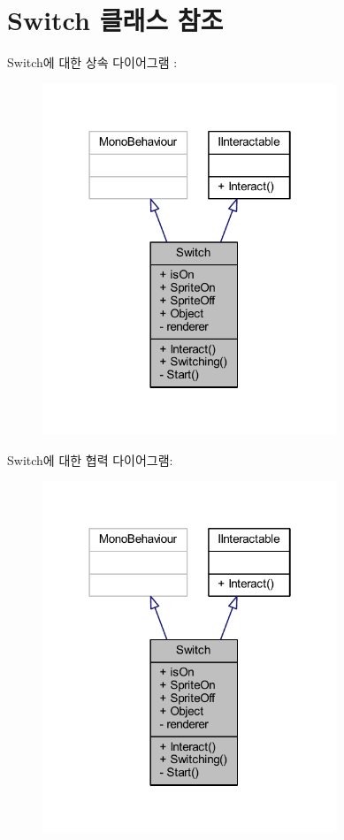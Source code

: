 \hypertarget{class_switch}{}\section{Switch 클래스 참조}
\label{class_switch}


Switch에 대한 상속 다이어그램 \+: \nopagebreak
\begin{figure}[H]
\begin{center}
\leavevmode
\includegraphics[width=250pt]{d5/d5e/class_switch__inherit__graph}
\end{center}
\end{figure}


Switch에 대한 협력 다이어그램\+:\nopagebreak
\begin{figure}[H]
\begin{center}
\leavevmode
\includegraphics[width=250pt]{d6/d28/class_switch__coll__graph}
\end{center}
\end{figure}
